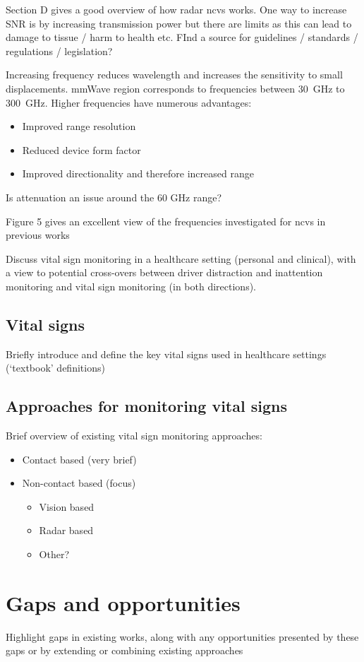 \documentclass[11pt, parskip=half*,twoside=false]{scrbook}
\begin{document}
Section D gives a good overview of how radar \gls{ncvs} works. One way to increase SNR is by increasing transmission power but there are limits as this can lead to damage to tissue / harm to health etc. FInd a source for guidelines / standards / regulations / legislation?

Increasing frequency reduces wavelength and increases the sensitivity to small displacements. mmWave region corresponds to frequencies between 30~GHz to 300~GHz.  Higher frequencies have numerous advantages:
\begin{itemize}
	\item Improved range resolution
	\item Reduced device form factor
	\item Improved directionality and therefore increased range
\end{itemize}

Is attenuation an issue around the 60 GHz range?

Figure 5 gives an excellent view of the frequencies investigated for \gls{ncvs} in previous works


Discuss vital sign monitoring in a healthcare setting (personal and clinical), with a view to potential cross-overs between driver distraction and inattention monitoring and vital sign monitoring (in both directions).
\subsection{Vital signs}
Briefly introduce and define the key vital signs used in healthcare settings (`textbook' definitions)
\subsection{Approaches for monitoring vital signs}
Brief overview of existing vital sign monitoring approaches:
\begin{itemize}
	\item Contact based (very brief)
	\item Non-contact based (focus)
	\begin{itemize}
		\item Vision based
		\item Radar based
		\item Other?
	\end{itemize}
\end{itemize}

\section{Gaps and opportunities}
Highlight gaps in existing works, along with any opportunities presented by these gaps or by extending or combining existing approaches
\end{document}
